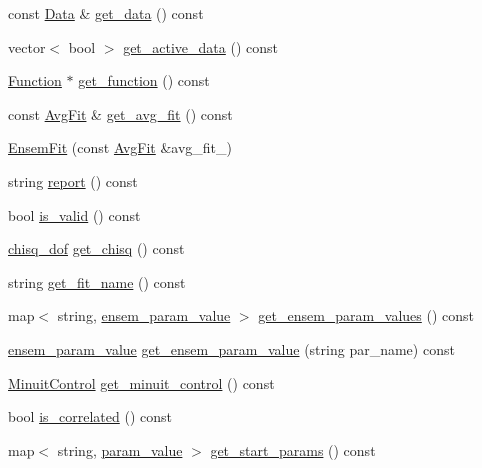 \begin{DoxyCompactItemize}
const \mbox{\hyperlink{classData}{Data}} \& \mbox{\hyperlink{classEnsemFit_a3015ab1126ad56869931c3ee6e5f054f}{get\+\_\+data}} () const
\item 
vector$<$ bool $>$ \mbox{\hyperlink{classEnsemFit_a562d0418f52bf3491752e53a1f65f13b}{get\+\_\+active\+\_\+data}} () const
\item 
\mbox{\hyperlink{classFunction}{Function}} $\ast$ \mbox{\hyperlink{classEnsemFit_a0731f0c71cd1b0b6c9d26ebff9cc3620}{get\+\_\+function}} () const
\item 
const \mbox{\hyperlink{classAvgFit}{Avg\+Fit}} \& \mbox{\hyperlink{classEnsemFit_ad84c2ab3c1bce4d11140ff275acd27ae}{get\+\_\+avg\+\_\+fit}} () const
\item 
\mbox{\hyperlink{classEnsemFit_ae8fc27d065976ce4b2a357b457e7755d}{Ensem\+Fit}} (const \mbox{\hyperlink{classAvgFit}{Avg\+Fit}} \&avg\+\_\+fit\+\_\+)
\item 
string \mbox{\hyperlink{classEnsemFit_a699cb4ec2b3d2107c67aaed422414f4d}{report}} () const
\item 
bool \mbox{\hyperlink{classEnsemFit_a5f154286b15fe9dbfe74fd5e00b4ed11}{is\+\_\+valid}} () const
\item 
\mbox{\hyperlink{structchisq__dof}{chisq\+\_\+dof}} \mbox{\hyperlink{classEnsemFit_a4122f6735d730a4759cc134056b8aa96}{get\+\_\+chisq}} () const
\item 
string \mbox{\hyperlink{classEnsemFit_a16f3c8ad4cdab894e5e4e1262bc9fcb6}{get\+\_\+fit\+\_\+name}} () const
\item 
map$<$ string, \mbox{\hyperlink{structensem__param__value}{ensem\+\_\+param\+\_\+value}} $>$ \mbox{\hyperlink{classEnsemFit_aefa2dcc89aad7c209fac39ebba06372a}{get\+\_\+ensem\+\_\+param\+\_\+values}} () const
\item 
\mbox{\hyperlink{structensem__param__value}{ensem\+\_\+param\+\_\+value}} \mbox{\hyperlink{classEnsemFit_afa01cceaae9172656f561cdd2d63121b}{get\+\_\+ensem\+\_\+param\+\_\+value}} (string par\+\_\+name) const
\item 
\mbox{\hyperlink{structMinuitControl}{Minuit\+Control}} \mbox{\hyperlink{classEnsemFit_a47405314215c4adc9420af46dd5d9572}{get\+\_\+minuit\+\_\+control}} () const
\item 
bool \mbox{\hyperlink{classEnsemFit_a1abab16ecba6b2a75d6d570585d35e9a}{is\+\_\+correlated}} () const
\item 
map$<$ string, \mbox{\hyperlink{structparam__value}{param\+\_\+value}} $>$ \mbox{\hyperlink{classEnsemFit_a24424685749c260b1db4e63e34de74ae}{get\+\_\+start\+\_\+params}} () const

\end{DoxyCompactItemize}
